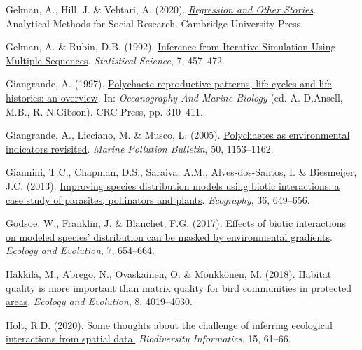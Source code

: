 \documentclass[9pt,biorxiv,doublespacing,lineno,endfloat]{lapreprint}
\newlength{\cslhangindent}
\newlength{\cslentryspacingunit} %
\newenvironment{CSLReferences}[2] %
 {%
  \setlength{\parindent}{0pt}
  \ifodd #1
  \let\oldpar\par
  \def\par{\hangindent=\cslhangindent\oldpar}
  \fi
  \setlength{\parskip}{#2\cslentryspacingunit}
 }%
 {}
\begin{document}
\begin{CSLReferences}{1}{0}
\leavevmode{}%
Gelman, A., Hill, J. \& Vehtari, A. (2020).
\emph{\href{https://doi.org/10.1017/9781139161879}{Regression and Other
Stories}}. Analytical Methods for Social Research. Cambridge University
Press.

\leavevmode{}%
Gelman, A. \& Rubin, D.B. (1992).
\href{https://doi.org/10.1214/ss/1177011136}{Inference from Iterative
Simulation Using Multiple Sequences}. \emph{Statistical Science}, 7,
457--472.

\leavevmode{}%
Giangrande, A. (1997).
\href{https://doi.org/10.1201/b12590-8}{Polychaete reproductive
patterns, life cycles and life histories: an overview}. In:
\emph{Oceanography And Marine Biology} (ed. A. D.Ansell, M.B., R.
N.Gibson). CRC Press, pp. 310--411.

\leavevmode{}%
Giangrande, A., Licciano, M. \& Musco, L. (2005).
\href{https://doi.org/10.1016/j.marpolbul.2005.08.003}{Polychaetes as
environmental indicators revisited}. \emph{Marine Pollution Bulletin},
50, 1153--1162.

\leavevmode{}%
Giannini, T.C., Chapman, D.S., Saraiva, A.M., Alves-dos-Santos, I. \&
Biesmeijer, J.C. (2013).
\href{https://doi.org/10.1111/j.1600-0587.2012.07191.x}{Improving
species distribution models using biotic interactions: a case study of
parasites, pollinators and plants}. \emph{Ecography}, 36, 649--656.

\leavevmode{}%
Godsoe, W., Franklin, J. \& Blanchet, F.G. (2017).
\href{https://doi.org/10.1002/ece3.2657}{Effects of biotic interactions
on modeled species' distribution can be masked by environmental
gradients}. \emph{Ecology and Evolution}, 7, 654--664.

\leavevmode{}%
Häkkilä, M., Abrego, N., Ovaskainen, O. \& Mönkkönen, M. (2018).
\href{https://doi.org/10.1002/ece3.3923}{Habitat quality is more
important than matrix quality for bird communities in protected areas}.
\emph{Ecology and Evolution}, 8, 4019--4030.

\leavevmode{}%
Holt, R.D. (2020). \href{https://doi.org/10.17161/bi.v15i1.13302}{Some
thoughts about the challenge of inferring ecological interactions from
spatial data.} \emph{Biodiversity Informatics}, 15, 61--66.


\end{CSLReferences}
\end{document}
